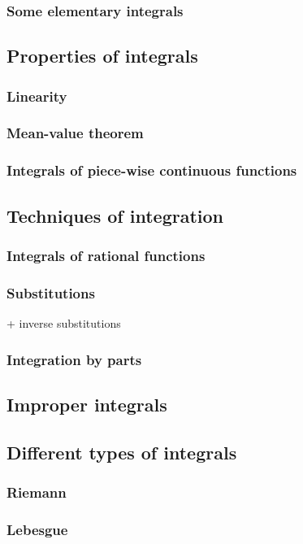 \subsubsection{Some elementary integrals}

\subsection{Properties of integrals}
\subsubsection{Linearity}
\subsubsection{Mean-value theorem}
\subsubsection{Integrals of piece-wise continuous functions}

\subsection{Techniques of integration}
\subsubsection{Integrals of rational functions}
\subsubsection{Substitutions}
+ inverse substitutions
\subsubsection{Integration by parts}


\subsection{Improper integrals}


\subsection{Different types of integrals}
\subsubsection{Riemann}
\subsubsection{Lebesgue}
